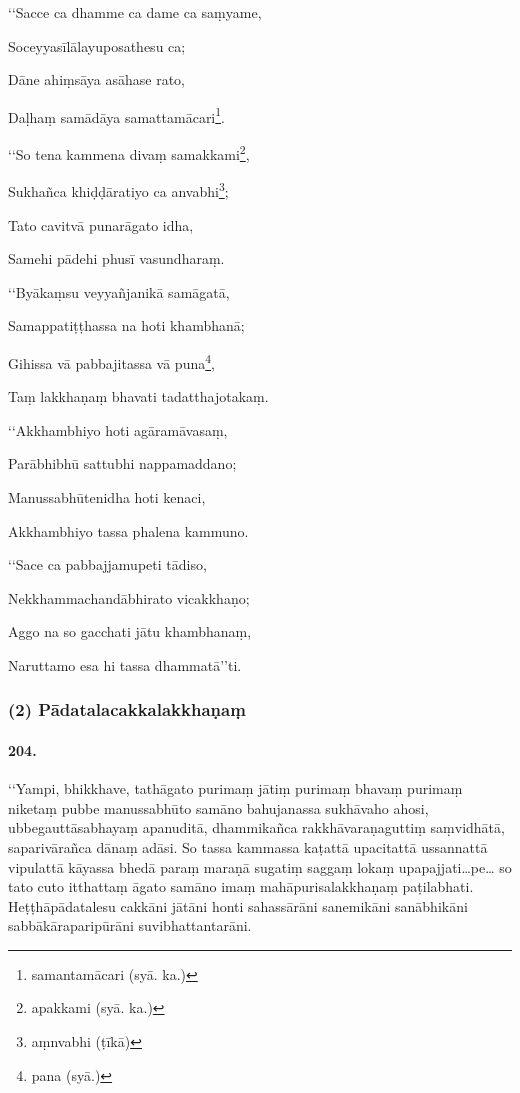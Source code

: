 ‘‘Sacce ca dhamme ca dame ca saṃyame,

Soceyyasīlālayuposathesu ca;

Dāne ahiṃsāya asāhase rato,

Daḷhaṃ samādāya samattamācari\footnote{samantamācari (syā. ka.)}.

‘‘So tena kammena divaṃ samakkami\footnote{apakkami (syā. ka.)},

Sukhañca khiḍḍāratiyo ca anvabhi\footnote{aṃnvabhi (ṭīkā)};

Tato cavitvā punarāgato idha,

Samehi pādehi phusī vasundharaṃ.

‘‘Byākaṃsu veyyañjanikā samāgatā,

Samappatiṭṭhassa na hoti khambhanā;

Gihissa vā pabbajitassa vā puna\footnote{pana (syā.)},

Taṃ lakkhaṇaṃ bhavati tadatthajotakaṃ.

‘‘Akkhambhiyo hoti agāramāvasaṃ,

Parābhibhū sattubhi nappamaddano;

Manussabhūtenidha hoti kenaci,

Akkhambhiyo tassa phalena kammuno.

‘‘Sace ca pabbajjamupeti tādiso,

Nekkhammachandābhirato vicakkhaṇo;

Aggo na so gacchati jātu khambhanaṃ,

Naruttamo esa hi tassa dhammatā’’ti.

\subsubsection{(2) Pādatalacakkalakkhaṇaṃ}

\paragraph{204.} ‘‘Yampi, bhikkhave, tathāgato purimaṃ jātiṃ purimaṃ bhavaṃ purimaṃ niketaṃ pubbe manussabhūto samāno bahujanassa sukhāvaho ahosi, ubbegauttāsabhayaṃ apanuditā, dhammikañca rakkhāvaraṇaguttiṃ saṃvidhātā, saparivārañca dānaṃ adāsi. So tassa kammassa kaṭattā upacitattā ussannattā vipulattā kāyassa bhedā paraṃ maraṇā sugatiṃ saggaṃ lokaṃ upapajjati…pe… so tato cuto itthattaṃ āgato samāno imaṃ mahāpurisalakkhaṇaṃ paṭilabhati. Heṭṭhāpādatalesu cakkāni jātāni honti sahassārāni sanemikāni sanābhikāni sabbākāraparipūrāni suvibhattantarāni.

